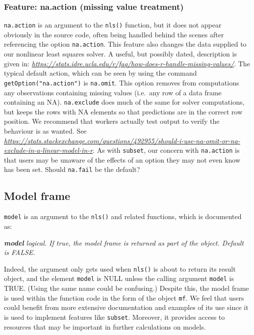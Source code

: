 \hypertarget{feature-na.action-missing-value-treatment}{%
\subsubsection{Feature: na.action (missing value treatment)}\label{feature-na.action-missing-value-treatment}}

\texttt{na.action} is an argument to the \texttt{nls()} function, but it does not appear
obviously in the source code, often being handled behind the scenes after
referencing the option \texttt{na.action}. This feature also changes the data
supplied to our nonlinear least squares solver.
A useful, but possibly dated, description is given in:
\emph{\url{https://stats.idre.ucla.edu/r/faq/how-does-r-handle-missing-values/}}.
The typical default action, which can be seen by using the command
\texttt{getOption("na.action")}
is \texttt{na.omit}. This option removes from computations any observations
containing missing values (i.e.~any row of a data frame containing an NA).
\texttt{na.exclude} does much of the same for solver computations, but keeps the rows with
NA elements so that predictions are in the correct row position. We recommend that
workers actually test output to verify the behaviour is as wanted.
See \emph{\url{https://stats.stackexchange.com/questions/492955/should-i-use-na-omit-or-na-exclude-in-a-linear-model-in-r}}.
As with \texttt{subset}, our concern with \texttt{na.action} is that users may be unaware of the
effects of an option they may not even know has been set. Should \texttt{na.fail} be the default?

\hypertarget{model-frame}{%
\subsection{Model frame}\label{model-frame}}

\texttt{model} is an argument to the \texttt{nls()} and related functions, which is documented as:

\emph{\textbf{model} logical. If true, the model frame is returned as part of the object. Default is FALSE.}

Indeed, the argument only gets used when \texttt{nls()} is about to return its result
object, and the
element \texttt{model} is NULL unless the calling argument \texttt{model} is TRUE. (Using the same
name could
be confusing.) Despite this, the model frame is used within the function code in
the form of the object
\texttt{mf}. We feel that users could benefit from more extensive documentation and
examples of its use since it is used to implement features like \texttt{subset}. Moreover,
it provides access to resources that may be important in further calculations on
models.

